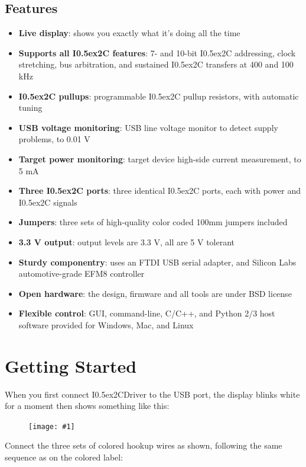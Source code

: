 \documentclass{article}
\newcommand{\two}{\raise0.5ex\hbox{\footnotesize{2}}}
\newcommand{\iic}{I\two{}C}
\newcommand{\iicdriver}{I\two{}CDriver}
\newcommand{\png}[1]{
\begin{figure}[H]
\begin{center}
\texttt{[image: \#1]}
\end{center}
\end{figure}
}
\begin{document}
\subsection{Features}
\begin{itemize}
\item \textbf{Live display}: shows you exactly what it's doing all the time  
\item \textbf{Supports all \iic{} features}: 7- and 10-bit \iic{} addressing, clock stretching, bus arbitration,
and sustained \iic{} transfers at 400 and 100 kHz  
\item \textbf{\iic{} pullups}: programmable \iic{} pullup resistors, with automatic tuning  
\item \textbf{USB voltage monitoring}: USB line voltage monitor to detect supply problems, to 0.01 V  
\item \textbf{Target power monitoring}: target device high-side current measurement, to 5 mA  
\item \textbf{Three \iic{} ports}: three identical \iic{} ports, each with power and \iic{} signals  
\item \textbf{Jumpers}: three sets of high-quality color coded 100mm jumpers included
\item \textbf{3.3 V output}: output levels are 3.3 V, all are 5 V tolerant  
\item \textbf{Sturdy componentry}: uses an FTDI USB serial adapter, and Silicon Labs automotive-grade EFM8 controller  
\item \textbf{Open hardware}: the design, firmware and all tools are under BSD license
\item \textbf{Flexible control}: GUI, command-line, C/C++, and Python 2/3 host software provided for Windows, Mac, and Linux  
\end{itemize}

\newpage
\section{Getting Started}

When you first connect \iicdriver{} to the USB port, the display blinks white for a moment then shows something like this:

\png{img/i2cdriver/DSC_9039}

Connect the three sets of colored hookup wires as shown,
following the same sequence as on the colored label:

\end{document}
